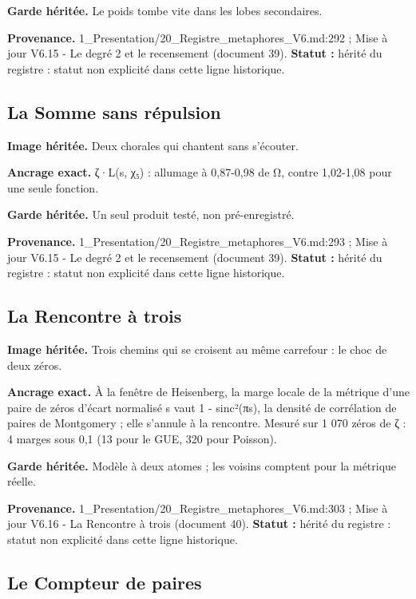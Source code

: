 \documentclass[
  9pt,
  a4paper,
]{article}
\begin{document}
\textbf{Garde héritée.} Le poids tombe vite dans les lobes secondaires.

\textbf{Provenance.} 1\_Presentation/20\_Registre\_metaphores\_V6.md:292
; Mise à jour V6.15 - Le degré 2 et le recensement (document 39).
\textbf{Statut :} hérité du registre : statut non explicité dans cette
ligne historique.

\hypertarget{la-somme-sans-ruxe9pulsion}{%
\subsection{La Somme sans répulsion}\label{la-somme-sans-ruxe9pulsion}}

\textbf{Image héritée.} Deux chorales qui chantent sans s'écouter.

\textbf{Ancrage exact.} ζ·L(s, χ₅) : allumage à 0,87-0,98 de Ω, contre
1,02-1,08 pour une seule fonction.

\textbf{Garde héritée.} Un seul produit testé, non pré-enregistré.

\textbf{Provenance.} 1\_Presentation/20\_Registre\_metaphores\_V6.md:293
; Mise à jour V6.15 - Le degré 2 et le recensement (document 39).
\textbf{Statut :} hérité du registre : statut non explicité dans cette
ligne historique.

\hypertarget{la-rencontre-uxe0-trois}{%
\subsection{La Rencontre à trois}\label{la-rencontre-uxe0-trois}}

\textbf{Image héritée.} Trois chemins qui se croisent au même carrefour
: le choc de deux zéros.

\textbf{Ancrage exact.} À la fenêtre de Heisenberg, la marge locale de
la métrique d'une paire de zéros d'écart normalisé s vaut 1 - sinc²(πs),
la densité de corrélation de paires de Montgomery ; elle s'annule à la
rencontre. Mesuré sur 1 070 zéros de ζ : 4 marges sous 0,1 (13 pour le
GUE, 320 pour Poisson).

\textbf{Garde héritée.} Modèle à deux atomes ; les voisins comptent pour
la métrique réelle.

\textbf{Provenance.} 1\_Presentation/20\_Registre\_metaphores\_V6.md:303
; Mise à jour V6.16 - La Rencontre à trois (document 40). \textbf{Statut
:} hérité du registre : statut non explicité dans cette ligne
historique.

\hypertarget{le-compteur-de-paires}{%
\subsection{Le Compteur de paires}\label{le-compteur-de-paires}}
\end{document}
